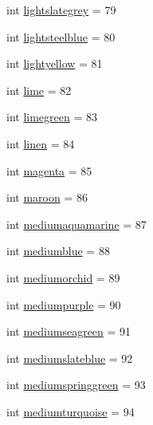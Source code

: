 \begin{DoxyCompactItemize}
\item 
int \mbox{\hyperlink{classbridges_1_1named__color_1_1_named_color_a36a3b92bad32383bd89c83166f3d0225}{lightslategrey}} = 79
\item 
int \mbox{\hyperlink{classbridges_1_1named__color_1_1_named_color_a1172078d2f432e43d290c3daa6019b14}{lightsteelblue}} = 80
\item 
int \mbox{\hyperlink{classbridges_1_1named__color_1_1_named_color_acee72a5014856c8971bde9ad1f6f2b69}{lightyellow}} = 81
\item 
int \mbox{\hyperlink{classbridges_1_1named__color_1_1_named_color_a72bdae0466fe60c6687e920e905ac7e8}{lime}} = 82
\item 
int \mbox{\hyperlink{classbridges_1_1named__color_1_1_named_color_ac414217e1d9dfe3644845708f1f701e1}{limegreen}} = 83
\item 
int \mbox{\hyperlink{classbridges_1_1named__color_1_1_named_color_af7e23db411aa5784ea66e44a230c17d0}{linen}} = 84
\item 
int \mbox{\hyperlink{classbridges_1_1named__color_1_1_named_color_a7a9a5819c288f4b93f983472e71a2630}{magenta}} = 85
\item 
int \mbox{\hyperlink{classbridges_1_1named__color_1_1_named_color_a13fe4a1b9f9afcbf82810fb83a478c0c}{maroon}} = 86
\item 
int \mbox{\hyperlink{classbridges_1_1named__color_1_1_named_color_a77a4ef04ba8631b371668f11755ce950}{mediumaquamarine}} = 87
\item 
int \mbox{\hyperlink{classbridges_1_1named__color_1_1_named_color_a981fe35ca8dbd04e631ed9047aa148f6}{mediumblue}} = 88
\item 
int \mbox{\hyperlink{classbridges_1_1named__color_1_1_named_color_a1bfe636c37b062be9f6da68b7ae5da44}{mediumorchid}} = 89
\item 
int \mbox{\hyperlink{classbridges_1_1named__color_1_1_named_color_af5c5240bb83753576efd92ae13b15b95}{mediumpurple}} = 90
\item 
int \mbox{\hyperlink{classbridges_1_1named__color_1_1_named_color_a60f8895f1c6b01193331fb1e5196c8b9}{mediumseagreen}} = 91
\item 
int \mbox{\hyperlink{classbridges_1_1named__color_1_1_named_color_acffca3e69457a52a612d827608a44c13}{mediumslateblue}} = 92
\item 
int \mbox{\hyperlink{classbridges_1_1named__color_1_1_named_color_a50e9b6dd7d58a4f56ac8762dabeb1f3b}{mediumspringgreen}} = 93
\item 
int \mbox{\hyperlink{classbridges_1_1named__color_1_1_named_color_a0f68a5e6469f8677a621e8110a1cec2a}{mediumturquoise}} = 94

\end{DoxyCompactItemize}
